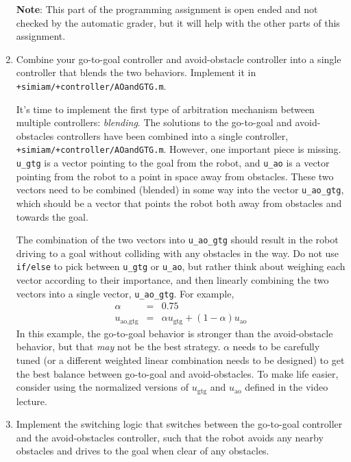 \documentclass[10pt]{article}
\begin{document}
\begin{enumerate}
  \textbf{Note}: This part of the programming assignment is open ended and not checked by the automatic grader, but it will help with the other parts of this assignment.
  
  \item Combine your go-to-goal controller and avoid-obstacle controller into a single controller that blends the two behaviors. Implement it in \texttt{+simiam/+controller/AOandGTG.m}.
  
  It's time to implement the first type of arbitration mechanism between multiple controllers: \textit{blending}. The solutions to the go-to-goal and avoid-obstacles controllers have been combined into a single controller, \texttt{+simiam/+controller/AOandGTG.m}. However, one important piece is missing. \texttt{u\_gtg} is a vector pointing to the goal from the robot, and \texttt{u\_ao} is a vector pointing from the robot to a point in space away from obstacles. These two vectors need to be combined (blended) in some way into the vector \texttt{u\_ao\_gtg}, which should be a vector that points the robot both away from obstacles and towards the goal.
  
  The combination of the two vectors into \texttt{u\_ao\_gtg} should result in the robot driving to a goal without colliding with any obstacles in the way. Do not use \texttt{if/else} to pick between \texttt{u\_gtg} or \texttt{u\_ao}, but rather think about weighing each vector according to their importance, and then linearly combining the two vectors into a single vector, \texttt{u\_ao\_gtg}. For example,
  \begin{eqnarray*}
    \alpha &=& 0.75 \\
    u_{\text{ao,gtg}} &=& \alpha u_{\text{gtg}}+(1-\alpha)u_{\text{ao}}
  \end{eqnarray*}
  In this example, the go-to-goal behavior is stronger than the avoid-obstacle behavior, but that \textit{may} not be the best strategy. $\alpha$ needs to be carefully tuned (or a different weighted linear combination needs to be designed) to get the best balance between go-to-goal and avoid-obstacles. To make life easier, consider using the normalized versions of $u_{\text{gtg}}$ and $u_{\text{ao}}$ defined in the video lecture.
  
  \item Implement the switching logic that switches between the go-to-goal controller and the avoid-obstacles controller, such that the robot avoids any nearby obstacles and drives to the goal when clear of any obstacles.
  

\end{enumerate}
\end{document}
